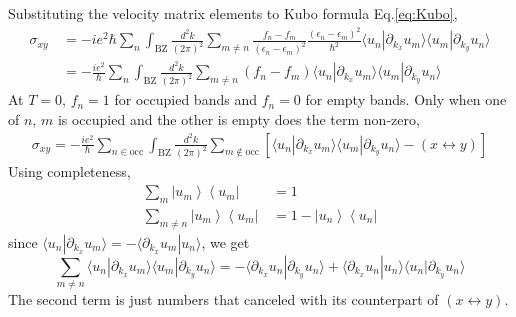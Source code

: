 \documentclass[12pt,a4paper]{article}
\newcommand{\bra}[1]{\left\langle{#1}\right|}
\newcommand{\ket}[1]{\left|{#1}\right\rangle}
\newcommand{\braket}[2]{\langle{#1}|{#2}\rangle}
\begin{document}
    Substituting the velocity matrix elements to Kubo formula Eq.\eqref{eq:Kubo},
    \[\begin{aligned}
        \sigma_{xy}
        &\, = -ie^2\hbar \sum_n
        \int_{\mathrm{BZ}}\frac{d^2k}{(2\pi)^2} \sum_{m\neq n}
        \frac{f_n-f_m}{(\epsilon_n-\epsilon_m)^2}
        \frac{(\epsilon_n-\epsilon_m)^2}{\hbar^2}
        \braket{u_n}{\partial_{k_x}u_m} \braket{u_m}{\partial_{k_y}u_n} \\
        &\, = -\frac{ie^2}{\hbar} \sum_n
        \int_{\mathrm{BZ}}\frac{d^2k}{(2\pi)^2} \sum_{m\neq n}
        (f_n-f_m) \braket{u_n}{\partial_{k_x}u_m} \braket{u_m}{\partial_{k_y}u_n}
    \end{aligned}\]
    At $T=0$, $f_n=1$ for occupied bands and $f_n=0$ for empty bands. Only when one of $n$, $m$ is occupied and the other is empty does the term non-zero,
    \[\begin{aligned}
        \sigma_{xy}
        = -\frac{ie^2}{\hbar} \sum_{n\in\mathrm{occ}}
        \int_{\mathrm{BZ}}\frac{d^2k}{(2\pi)^2} \sum_{m\notin\mathrm{occ}}
        \left[ \braket{u_n}{\partial_{k_x}u_m} \braket{u_m}{\partial_{k_y}u_n}
        -
        (x\leftrightarrow y) \right]
    \end{aligned}\]
    Using completeness,
    \[\begin{aligned}
        \sum_m \ket{u_m}\bra{u_m} &\, = 1 \\
        \sum_{m\neq n} \ket{u_m}\bra{u_m}
        &\, = 1 - \ket{u_n}\bra{u_n}
    \end{aligned}\]
    since $\braket{u_n}{\partial_{k_x}u_m} = - \braket{\partial_{k_x}u_m}{u_n}$, we get
    \[
        \sum_{m\neq n} \braket{u_n}{\partial_{k_x}u_m} \braket{u_m}{\partial_{k_y}u_n}
        = - \braket {\partial_{k_x}u_n}{\partial_{k_y}u_n}
        + \braket{\partial_{k_x}u_n}{u_n} \braket{u_n}{\partial_{k_y}u_n}
    \]
    The second term is just numbers that canceled with its counterpart of $(x\leftrightarrow y)$.
\end{document}
